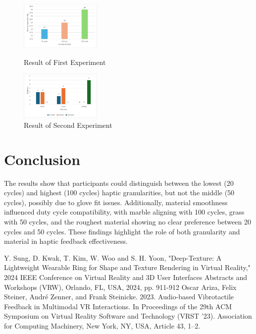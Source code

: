 \documentclass[a4paper,twocolumn]{article}
\begin{document}
\begin{figure}[h]
  \centering
  \includegraphics[width=0.35\textwidth]{./Fig/Blind_Test_graph.png}
  \caption{{Result of First Experiment}}
  \label{fig1}
  \vspace{0.1cm}
  \centering
  \includegraphics[width=0.35\textwidth]{./Fig/Select_Cycle_graph.png}
  \caption{{Result of Second Experiment}}
  \label{fig2}
\end{figure}


\section{Conclusion}
The results show that participants could distinguish between the lowest (20 cycles) and highest (100 cycles) haptic granularities, but not the middle (50 cycles), possibly due to glove fit issues. Additionally, material smoothness influenced duty cycle compatibility, with marble aligning with 100 cycles, grass with 50 cycles, and the roughest material showing no clear preference between 20 cycles and 50 cycles. These findings highlight the role of both granularity and material in haptic feedback effectiveness.
\begin{thebibliography}{99}
\scriptsize
     Y. Sung, D. Kwak, T. Kim, W. Woo and S. H. Yoon, "Deep-Texture: A Lightweight Wearable Ring for Shape and Texture Rendering in Virtual Reality," 2024 IEEE Conference on Virtual Reality and 3D User Interfaces Abstracts and Workshops (VRW), Orlando, FL, USA, 2024, pp. 911-912
     Oscar Ariza, Felix Steiner, André Zenner, and Frank Steinicke. 2023. Audio-based Vibrotactile Feedback in Multimodal VR Interactions. In Proceedings of the 29th ACM Symposium on Virtual Reality Software and Technology (VRST '23). Association for Computing Machinery, New York, NY, USA, Article 43, 1–2.
\end{thebibliography}
\end{document}
